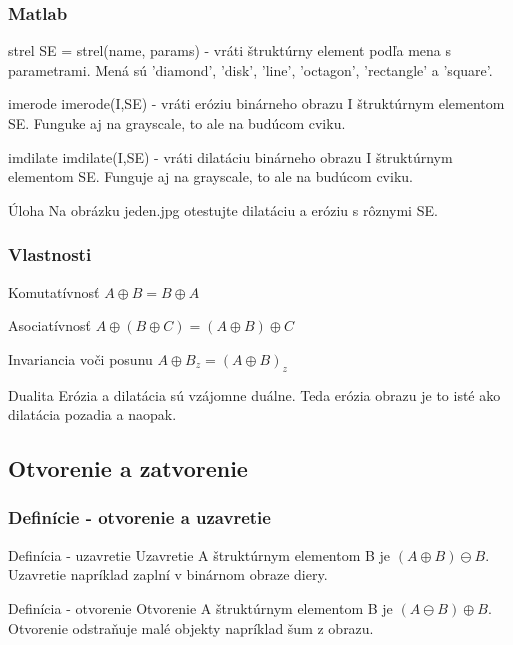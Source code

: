 \documentclass{beamer}
\begin{document}
\begin{frame}
\frametitle{Matlab} 
  \begin{block}{strel}
  SE = strel(name, params) - vráti štruktúrny element podľa mena s parametrami. Mená sú 'diamond', 'disk', 'line', 'octagon', 'rectangle' a 'square'.
  \end{block}
    
  \begin{block}{imerode}
  imerode(I,SE) - vráti eróziu binárneho obrazu I štruktúrnym elementom SE. Funguke aj na grayscale, to ale na budúcom cviku.
  \end{block}
  
    \begin{block}{imdilate}
  imdilate(I,SE) - vráti dilatáciu binárneho obrazu I štruktúrnym elementom SE. Funguje aj na grayscale, to ale na budúcom cviku.
  \end{block}
  
  \begin{block}{Úloha}
  Na obrázku jeden.jpg otestujte dilatáciu a eróziu s rôznymi SE.
  \end{block}
\end{frame}

\begin{frame}
\frametitle{Vlastnosti}
  \begin{block}{Komutatívnosť}
  $A \oplus B = B \oplus A$ 
  \end{block}
    
  \begin{block}{Asociatívnosť}
  $A \oplus (B \oplus C) = (A \oplus B) \oplus C$ 
  \end{block}
  
  \begin{block}{Invariancia voči posunu}
  $A \oplus B_z = (A \oplus B)_z$
  \end{block}
  
  \begin{block}{Dualita}
  Erózia a dilatácia sú vzájomne duálne. Teda erózia obrazu je to isté ako dilatácia pozadia a naopak.
  \end{block}
\end{frame}


\subsection{Otvorenie a zatvorenie}

\begin{frame}
\frametitle{Definície - otvorenie a uzavretie}
  \begin{block}{Definícia - uzavretie}
  Uzavretie A štruktúrnym elementom B je $(A \oplus B) \ominus B$. Uzavretie napríklad zaplní v binárnom obraze diery.
  \end{block}
  
  \begin{block}{Definícia - otvorenie}
  Otvorenie A štruktúrnym elementom B je $(A \ominus B) \oplus B$. Otvorenie odstraňuje malé objekty napríklad šum z obrazu.
  \end{block}
\end{frame}
\end{document}
